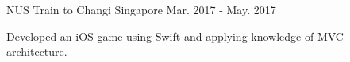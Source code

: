 \cventry
{NUS} %
{Train to Changi} %
{Singapore} %
{Mar. 2017 - May. 2017} %
{
  \begin{cvitems} %
    \item {Developed an \href{https://github.com/Zhiyuan-Amos/Train-to-Changi}{iOS game} using Swift and applying knowledge of MVC architecture.}
  \end{cvitems}
}
